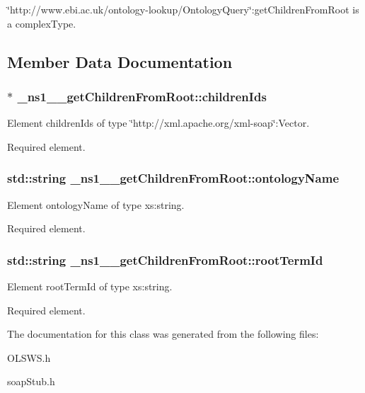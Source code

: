 \char`\"{}http://www.ebi.ac.uk/ontology-\/lookup/OntologyQuery\char`\"{}:getChildrenFromRoot is a complexType. 

\subsection{Member Data Documentation}
\hypertarget{class__ns1____getChildrenFromRoot_a6a4fc8be425fa39fc50be3c0a391e17c}{
\subsubsection[{childrenIds}]{$\ast$ {\bf \_\-ns1\_\-\_\-getChildrenFromRoot::childrenIds}}}
\label{class__ns1____getChildrenFromRoot_a6a4fc8be425fa39fc50be3c0a391e17c}


Element childrenIds of type \char`\"{}http://xml.apache.org/xml-\/soap\char`\"{}:Vector. 

Required element. \hypertarget{class__ns1____getChildrenFromRoot_a3e45501240a52ee09c5d35397f6ddafb}{
\subsubsection[{ontologyName}]{\setlength{\rightskip}{0pt plus 5cm}std::string {\bf \_\-ns1\_\-\_\-getChildrenFromRoot::ontologyName}}}
\label{class__ns1____getChildrenFromRoot_a3e45501240a52ee09c5d35397f6ddafb}


Element ontologyName of type xs:string. 

Required element. \hypertarget{class__ns1____getChildrenFromRoot_ac15da846ccc985bd285215b3e0ed94ad}{
\subsubsection[{rootTermId}]{\setlength{\rightskip}{0pt plus 5cm}std::string {\bf \_\-ns1\_\-\_\-getChildrenFromRoot::rootTermId}}}
\label{class__ns1____getChildrenFromRoot_ac15da846ccc985bd285215b3e0ed94ad}


Element rootTermId of type xs:string. 

Required element. 

The documentation for this class was generated from the following files:\begin{DoxyCompactItemize}
\item 
OLSWS.h\item 
soapStub.h\end{DoxyCompactItemize}
